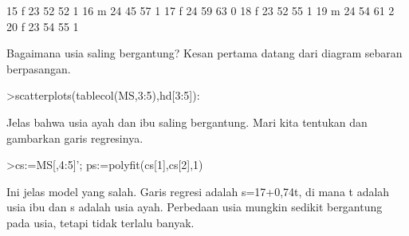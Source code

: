 \documentclass[a4paper,10pt]{article}
\begin{document}
\begin{eulernotebook}
\begin{eulercomment}
\begin{eulercomment}
\begin{eulercomment}
\begin{eulercomment}
\begin{eulercomment}
\begin{eulercomment}
\begin{eulercomment}
\begin{eulercomment}
\begin{eulercomment}
\begin{eulercomment}
\begin{eulercomment}
\begin{eulercomment}
\begin{eulercomment}
\begin{eulercomment}
\begin{eulercomment}
\begin{eulercomment}
\begin{eulercomment}
\begin{eulercomment}
\begin{eulercomment}
\begin{eulercomment}
\begin{eulercomment}
\begin{eulercomment}
\begin{eulercomment}
\begin{eulercomment}
\begin{eulercomment}
\begin{eulercomment}
\begin{eulercomment}
\begin{eulercomment}
\begin{eulercomment}
\begin{eulercomment}
\begin{eulercomment}
\begin{eulercomment}
\begin{euleroutput}
          15         f        23        52        52         1
          16         m        24        45        57         1
          17         f        24        59        63         0
          18         f        23        52        55         1
          19         m        24        54        61         2
          20         f        23        54        55         1
\end{euleroutput}
\begin{eulercomment}
Bagaimana usia saling bergantung? Kesan pertama datang dari diagram
sebaran berpasangan.
\end{eulercomment}
\begin{eulerprompt}
>scatterplots(tablecol(MS,3:5),hd[3:5]):
\end{eulerprompt}
\begin{eulercomment}
Jelas bahwa usia ayah dan ibu saling bergantung. Mari kita tentukan
dan gambarkan garis regresinya.
\end{eulercomment}
\begin{eulerprompt}
>cs:=MS[,4:5]'; ps:=polyfit(cs[1],cs[2],1)
\end{eulerprompt}
\begin{euleroutput}
  [17.3789,  0.740964]
\end{euleroutput}
\begin{eulercomment}
Ini jelas model yang salah. Garis regresi adalah s=17+0,74t, di mana t
adalah usia ibu dan s adalah usia ayah. Perbedaan usia mungkin sedikit
bergantung pada usia, tetapi tidak terlalu banyak.


\end{eulercomment}
\end{eulercomment}
\end{eulercomment}
\end{eulercomment}
\end{eulercomment}
\end{eulercomment}
\end{eulercomment}
\end{eulercomment}
\end{eulercomment}
\end{eulercomment}
\end{eulercomment}
\end{eulercomment}
\end{eulercomment}
\end{eulercomment}
\end{eulercomment}
\end{eulercomment}
\end{eulercomment}
\end{eulercomment}
\end{eulercomment}
\end{eulercomment}
\end{eulercomment}
\end{eulercomment}
\end{eulercomment}
\end{eulercomment}
\end{eulercomment}
\end{eulercomment}
\end{eulercomment}
\end{eulercomment}
\end{eulercomment}
\end{eulercomment}
\end{eulercomment}
\end{eulercomment}
\end{eulercomment}
\end{eulernotebook}
\end{document}

